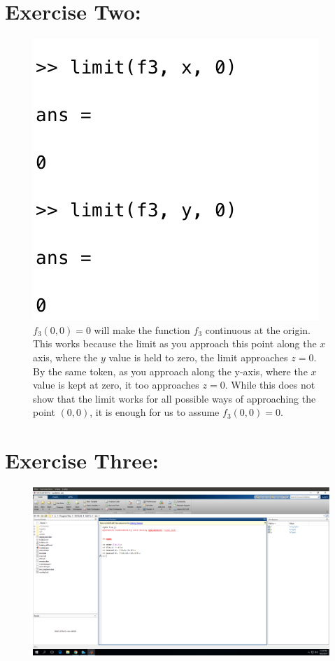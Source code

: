 \documentclass[11pt]{article}
\begin{document}
\section*{Exercise Two:}
\begin{figure}[H]
	\centering
	\includegraphics[width=\textwidth]{PartTwo}
	\caption{$f_3 (0,0)= 0$ will make the function $f_3$ continuous at the origin. This works because the limit as you approach this point along the $x$ axis, where the $y$ value is held to zero, the limit approaches $z = 0$.  By the same token, as you approach along the y-axis, where the $x$ value is kept at zero, it too approaches $z = 0$. While this does not show that the limit works for all possible ways of approaching the point $(0, 0)$, it is enough for us to assume $f_3 (0, 0) = 0$.}
\end{figure}

\section*{Exercise Three:}
\begin{figure}[H]
	\centering
	\includegraphics[width=\textwidth]{PartThree_1.png}
\end{figure}
\end{document}
